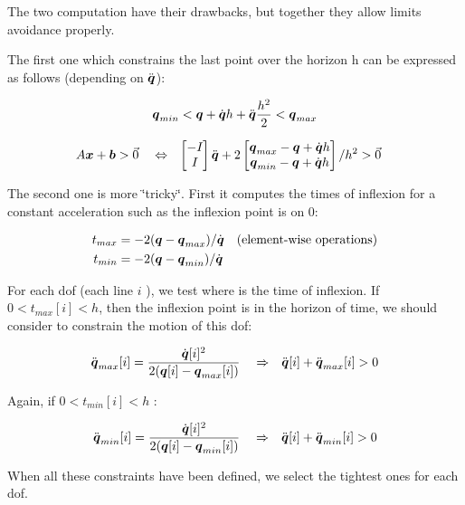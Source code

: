 The two computation have their drawbacks, but together they allow limits avoidance properly.

 The first one which constrains the last point over the horizon h can be expressed as follows (depending on $ \ddot{\mbox{\boldmath${q}$}} $)\+:

\begin{align*} \mbox{\boldmath${q}$}_{min} < \mbox{\boldmath${q}$} + \dot{\mbox{\boldmath${q}$}} h + \ddot{\mbox{\boldmath${q}$}} \frac{h^2}{2} < \mbox{\boldmath${q}$}_{max} \end{align*}

\begin{align*} A \mbox{\boldmath${x}$} + \mbox{\boldmath${b}$} &> \vec{0} & &\Leftrightarrow & \begin{bmatrix} - I_{} \\ I_{} \end{bmatrix} \ddot{\mbox{\boldmath${q}$}} + 2 \begin{bmatrix} \mbox{\boldmath${q}$}_{max} - \mbox{\boldmath${q}$} + \dot{\mbox{\boldmath${q}$}} h \\ \mbox{\boldmath${q}$}_{min} - \mbox{\boldmath${q}$} + \dot{\mbox{\boldmath${q}$}} h \end{bmatrix} / h^2 &> \vec{0} \end{align*}

The second one is more \char`\"{}tricky\char`\"{}. First it computes the times of inflexion for a constant acceleration such as the inflexion point is on 0\+:

\begin{align*} t_{max} &= - 2 ( \mbox{\boldmath${q}$} - \mbox{\boldmath${q}$}_{max} ) / \dot{\mbox{\boldmath${q}$}} & &\text{(element-wise operations)} \\ t_{min} &= - 2 ( \mbox{\boldmath${q}$} - \mbox{\boldmath${q}$}_{min} ) / \dot{\mbox{\boldmath${q}$}} \end{align*}

For each dof (each line $ i $ ), we test where is the time of inflexion. If $ 0 < t_{max}[i] < h$, then the inflexion point is in the horizon of time, we should consider to constrain the motion of this dof\+:

\begin{align*} \ddot{\mbox{\boldmath${q}$}}_{max}[i] &= \frac{ \dot{\mbox{\boldmath${q}$}}[i]^2 }{ 2(\mbox{\boldmath${q}$}[i] - \mbox{\boldmath${q}$}_{max}[i] ) } & & \Rightarrow & \ddot{\mbox{\boldmath${q}$}} [i] + \ddot{\mbox{\boldmath${q}$}}_{max}[i] > 0 \end{align*}

Again, if $ 0 < t_{min}[i] < h $ \+:

\begin{align*} \ddot{\mbox{\boldmath${q}$}}_{min}[i] &= \frac{ \dot{\mbox{\boldmath${q}$}}[i]^2 }{ 2(\mbox{\boldmath${q}$}[i] - \mbox{\boldmath${q}$}_{min}[i] ) } & & \Rightarrow & \ddot{\mbox{\boldmath${q}$}} [i] + \ddot{\mbox{\boldmath${q}$}}_{min}[i] > 0 \end{align*}

When all these constraints have been defined, we select the tightest ones for each dof.



